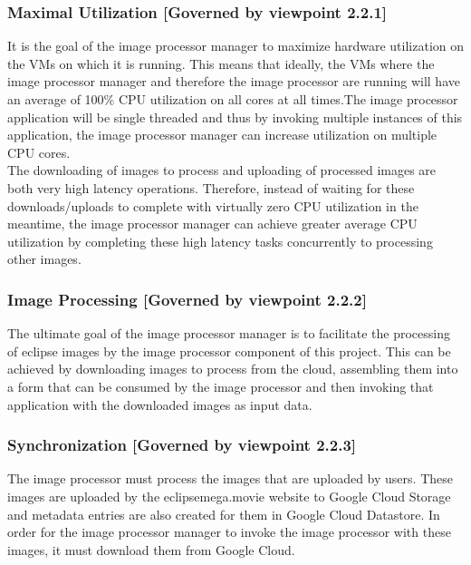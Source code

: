 \documentclass[10pt, onecolumn, draftclsnofoot, letterpaper, compsoc]{IEEEtran}
\begin{document}
    \subsubsection{Maximal Utilization [Governed by viewpoint 2.2.1]}
    It is the goal of the image processor manager to maximize hardware utilization on the VMs on which it is
    running. This means that ideally, the VMs where the image processor manager and therefore the image
    processor are running will have an average of 100\% CPU utilization on all cores at all times.The image
    processor application will be single threaded and thus by invoking multiple instances of this application,
    the image processor manager can increase utilization on multiple CPU cores. \\

    The downloading of images to process and uploading of processed images are both very high latency
    operations. Therefore, instead of waiting for these downloads/uploads to complete with virtually zero CPU
    utilization in the meantime, the image processor manager can achieve greater average CPU utilization by
    completing these high latency tasks concurrently to processing other images. \\

    \subsubsection{Image Processing [Governed by viewpoint 2.2.2]}
    The ultimate goal of the image processor manager is to facilitate the processing of eclipse images by the
    image processor component of this project. This can be achieved by downloading images to process from the
    cloud, assembling them into a form that can be consumed by the image processor and then invoking that
    application with the downloaded images as input data. \\

    \subsubsection{Synchronization [Governed by viewpoint 2.2.3]}
    The image processor must process the images that are uploaded by users. These images are uploaded by the
    eclipsemega.movie website to Google Cloud Storage and metadata entries are also created for them in Google
    Cloud Datastore. In order for the image processor manager to invoke the image processor with these images,
    it must download them from Google Cloud. \\
\end{document}
